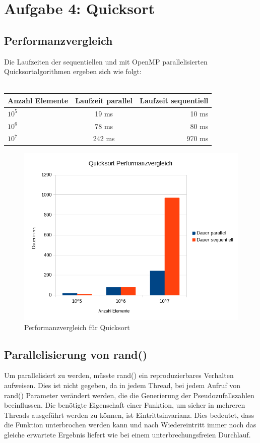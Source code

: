 \chapter{Aufgabe 4: Quicksort}
\section{Performanzvergleich}
Die Laufzeiten der sequentiellen und mit OpenMP parallelisierten Quicksortalgorithmen ergeben sich wie folgt:\\ \\

\begin{tabular}{l|c|r}
Anzahl Elemente & Laufzeit parallel & Laufzeit sequentiell \\
\hline
$10^5$ & 19 ms & 10 ms \\
$10^6$ & 78 ms & 80 ms \\
$10^7$ & 242 ms & 970 ms \\
\end{tabular}

\begin{figure}[H]
    \centering
    \includegraphics[width = \textwidth]{img/qs_performance_comparison.png}
    \caption{Performanzvergleich für Quicksort}
    \label{qs_perf_comp}
\end{figure}

\section{Parallelisierung von rand()}
Um parallelisiert zu werden, müsste rand() ein reproduzierbares Verhalten aufweisen. Dies ist nicht gegeben, da in jedem Thread, bei jedem Aufruf von rand() Parameter verändert werden, die die Generierung der Pseudozufallszahlen beeinflussen. Die benötigte Eigenschaft einer Funktion, um sicher in mehreren Threads ausgeführt werden zu können, ist Eintrittsinvarianz. Dies bedeutet, dass die Funktion unterbrochen werden kann und nach Wiedereintritt immer noch das gleiche erwartete Ergebnis liefert wie bei einem unterbrechungsfreien Durchlauf.
